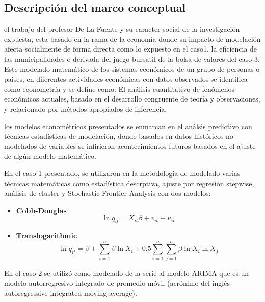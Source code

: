 \documentclass[
  american,
]{article}
\begin{document}
\hypertarget{descripciuxf3n-del-marco-conceptual}{%
\subsection{Descripción del marco
conceptual}\label{descripciuxf3n-del-marco-conceptual}}

el trabajo del profesor De La Fuente y su caracter social de la
investigación expuesta, esta basado en la rama de la economía donde su
impacto de modelación afecta socialmente de forma directa como lo
expuesto en el caso1, la eficiencia de las municipalidades o derivada
del juego bursatil de la bolsa de valores del caso 3. Este modelado
matemático de los sistemas económicos de un grupo de personas o paises,
en diferentes actividades económicas con datos observados se identifica
como econometría y se define como: El análisis cuantitativo de fenómenos
económicos actuales, basado en el desarrollo congruente de teoría y
observaciones, y relacionado por métodos apropiados de
inferencia\autocite{samuelson_report_1954-1}.

los modelos econométricos presentados se enmarcan en el análsis
predictivo con técnicas estadísticas de modelación, donde basados en
datos históricos no modelados de variables se infirieron acontecimientos
futuros basados en el ajuste de algún modelo matemático.

En el caso 1 presentado, se utilizaron en la metodología de modelado
varias técnicas matemáticas como estadística descrptiva, ajuste por
regresión stepwise, análisis de cluster y Stochastic Frontier Analysis
con dos modelos:

\begin{itemize}
\item
  \textbf{Cobb-Douglas} \[\ln q_{it}=X_{it}\beta +v_{it}-u_{it}\]
\item
  \textbf{Translogarithmic}
  \[\ln q_{it}= \beta +\sum_{i=1}^n \beta \ln X_i+0.5\sum_{i=1}^n\sum_{j=1}^n \beta \ln X_i \ln X_j\]
\end{itemize}

En el caso 2 se utilizó como modelado de la serie al modelo ARIMA que es
un modelo autorregresivo integrado de promedio móvil (acrónimo del
inglés autoregressive integrated moving average).
\end{document}
